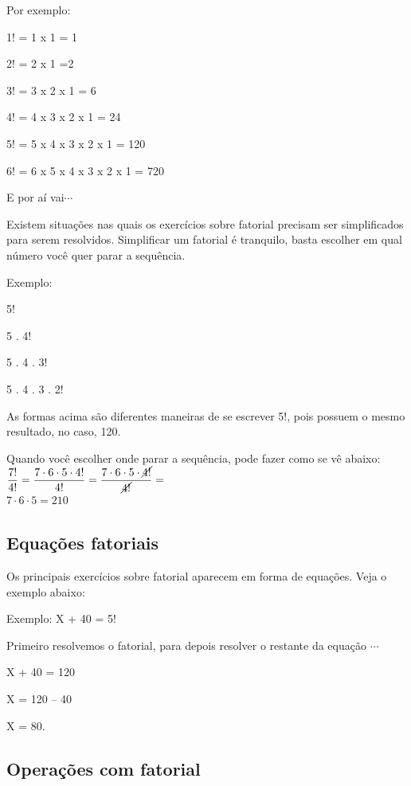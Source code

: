\begin{multicols*}{2}
    Por exemplo:

    1! = 1 x 1 = 1

    2! = 2 x 1 =2

    3! = 3 x 2 x 1 = 6

    4! = 4 x 3 x 2 x 1 = 24

    5! = 5 x 4 x 3 x 2 x 1 = 120

    6! = 6 x 5 x 4 x 3 x 2 x 1 = 720

    E por aí vai$\cdots$

    Existem situações nas quais os exercícios sobre fatorial precisam ser simplificados para serem resolvidos. Simplificar um fatorial é tranquilo, basta escolher em qual número você quer parar a sequência.

    Exemplo:

    5!

    5 . 4!

    5 . 4 . 3!

    5 . 4 . 3 . 2!

    As formas acima são diferentes maneiras de se escrever 5!, pois possuem o mesmo resultado, no caso, 120.

    Quando você escolher onde parar a sequência, pode fazer como se vê abaixo:\\

    $ \dfrac{7!}{4!} = \dfrac{7 \cdot 6 \cdot 5 \cdot 4!}{4!} = \dfrac{7 \cdot 6 \cdot 5 \cdot \cancel{4!}}{\cancel{4!}} = $\\

    $ 7 \cdot 6 \cdot 5 = 210 $

    \subsection{Equações fatoriais}

    Os principais exercícios sobre fatorial aparecem em forma de equações. Veja o exemplo abaixo:

    Exemplo: X + 40 = 5!

    Primeiro resolvemos o fatorial, para depois resolver o restante da equação $\cdots $

    X + 40 = 120

    X = 120 – 40

    X = 80.

    \subsection{Operações com fatorial}


\end{multicols*}
